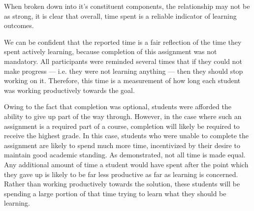         When broken down into it's constituent components, the relationship may not be as strong, it is clear that overall, time spent is a reliable indicator of learning outcomes.

        We can be confident that the reported time is a fair reflection of the time they spent actively learning, because completion of this assignment was not mandatory. 
        All participants were reminded several times that if they could not make progress --- 
        i.e. they were not learning anything --- then they should stop working on it. 
        Therefore, this time is a measurement of how long each student was working productively towards the goal. 

        Owing to the fact that completion was optional, students were afforded the ability to give up part of the way through. 
        However, in the case where such an assignment is a required part of a course, completion will likely be required to receive the highest grade. 
        In this case, students who were unable to complete the assignment are likely to spend much more time, incentivized by their desire to maintain good academic standing. 
        As \citeauthor{Z-Zeng} demonstrated, not all time is made equal. 
        Any additional amount of time a student would have spent after the point which they gave up is likely to be far less productive as far as learning is concerned. 
        Rather than working productively towards the solution, these students will be spending a large portion of that time trying to learn what they should be learning.


